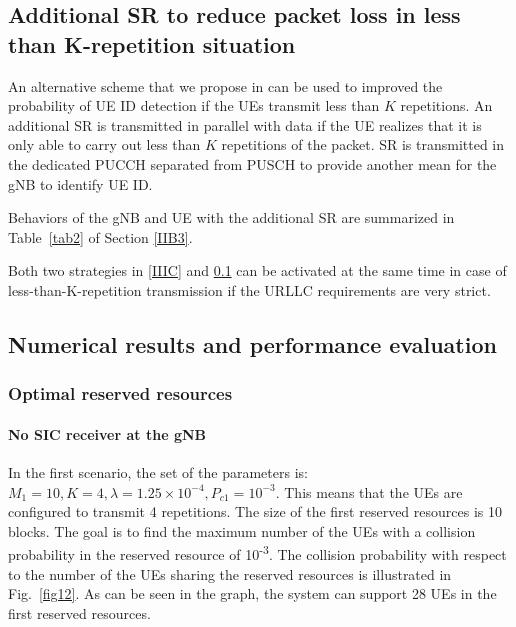 \documentclass{ieeeaccess}
\begin{document}
\subsection{Additional SR to reduce packet loss in less than K-repetition situation}\label{IIID}

An alternative scheme that we propose in \cite{ad100} can be used to improved the probability of UE ID detection if the UEs transmit less than $K$ repetitions. An additional SR is transmitted in parallel with data if the UE realizes that it is only able to carry out less than $K$ repetitions of the packet. SR is transmitted in the dedicated PUCCH separated from PUSCH to provide another mean for the gNB to identify UE ID.

Behaviors of the gNB and UE with the additional SR are summarized in Table~\ref{tab2} of Section \ref{IIB3}. 

Both two strategies in \ref{IIIC} and \ref{IIID} can be activated at the same time in case of less-than-K-repetition transmission if the URLLC requirements are very strict.

\subsection{Numerical results and performance evaluation}\label{IV}

\subsubsection{Optimal reserved resources}
\paragraph{No SIC receiver at the gNB}\label{IVB1}
In the first scenario, the set of the parameters is: $M_1=10, K=4, \lambda=1.25\times10^{-4}, P_{c1}=10^{-3}$.  This means that the UEs are configured to transmit 4 repetitions. The size of the first reserved resources is 10 blocks. The goal is to find the maximum number of the UEs with a collision probability in the reserved resource of 10\textsuperscript{-3}. The collision probability with respect to the number of the UEs sharing the reserved resources is illustrated in Fig.~\ref{fig12}. As can be seen in the graph, the system can support 28 UEs in the first reserved resources.
\end{document}
